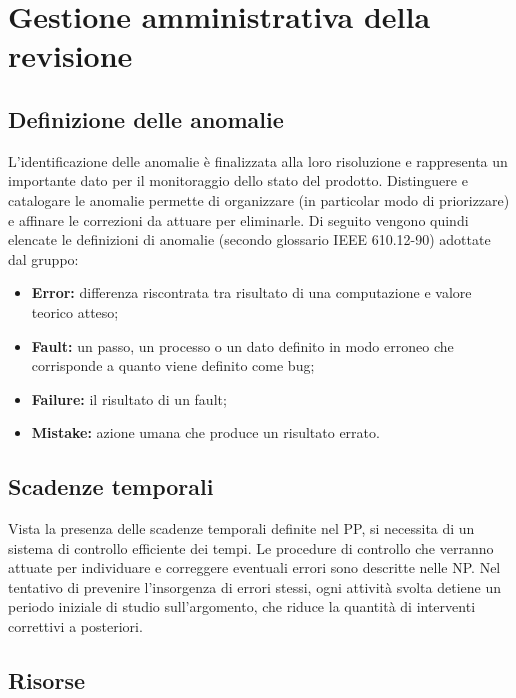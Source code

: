 \documentclass[openany,12pt,a4paper]{report}
\begin{document}

\chapter{Gestione amministrativa della revisione}

\section{Definizione delle anomalie}

L’identificazione delle anomalie è finalizzata alla loro risoluzione e rappresenta un importante dato per il monitoraggio dello stato del prodotto. Distinguere e catalogare le anomalie permette di organizzare (in particolar modo di priorizzare) e affinare le correzioni da attuare per eliminarle. Di seguito
vengono quindi elencate le definizioni di anomalie (secondo glossario IEEE 610.12-90) adottate dal gruppo:

\begin{itemize}
    \item \textbf{Error:} differenza riscontrata tra risultato di una computazione e valore teorico atteso;
    \item \textbf{Fault:} un passo, un processo o un dato definito in modo erroneo che corrisponde a quanto viene definito come bug;
    \item \textbf{Failure:} il risultato di un fault;
    \item \textbf{Mistake:} azione umana che produce un risultato errato.
\end{itemize}

\section{Scadenze temporali}

Vista la presenza delle scadenze temporali definite nel PP, si necessita di un sistema di controllo efficiente dei tempi. Le procedure di controllo che verranno attuate per individuare e correggere eventuali errori sono descritte
nelle NP. Nel tentativo di prevenire l'insorgenza di errori stessi, ogni attività svolta detiene un periodo iniziale di
studio sull'argomento, che riduce la quantità di interventi correttivi a posteriori.

\section{Risorse}
\end{document}
